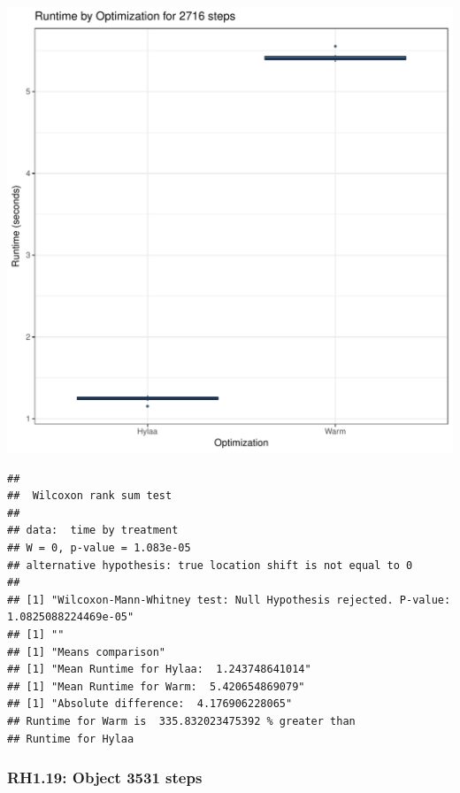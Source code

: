 \documentclass{article}\usepackage[]{graphicx}\usepackage[]{color}
\makeatletter
\def\maxwidth{ %
  \ifdim\Gin@nat@width>\linewidth
    \linewidth
  \else
    \Gin@nat@width
  \fi
}
\newenvironment{kframe}{%
 \def\at@end@of@kframe{}%
 \ifinner\ifhmode%
  \def\at@end@of@kframe{\end{minipage}}%
  \begin{minipage}{\columnwidth}%
 \fi\fi%
 \def\FrameCommand##1{\hskip\@totalleftmargin \hskip-\fboxsep
 \colorbox{shadecolor}{##1}\hskip-\fboxsep
     \hskip-\linewidth \hskip-\@totalleftmargin \hskip\columnwidth}%
 \MakeFramed {\advance\hsize-\width
   \@totalleftmargin\z@ \linewidth\hsize
   \@setminipage}}%
 {\par\unskip\endMakeFramed%
 \at@end@of@kframe}
\newenvironment{knitrout}{}{} %
\makeatother
\begin{document}
\begin{knitrout}
\color{fgcolor}
\includegraphics[width=\maxwidth]{figure/RH1_steps2716-1} 
\begin{kframe}\begin{verbatim}
## 
## 	Wilcoxon rank sum test
## 
## data:  time by treatment
## W = 0, p-value = 1.083e-05
## alternative hypothesis: true location shift is not equal to 0
## 
## [1] "Wilcoxon-Mann-Whitney test: Null Hypothesis rejected. P-value: 1.0825088224469e-05"
## [1] ""
## [1] "Means comparison"
## [1] "Mean Runtime for Hylaa:  1.243748641014"
## [1] "Mean Runtime for Warm:  5.420654869079"
## [1] "Absolute difference:  4.176906228065"
## Runtime for Warm is  335.832023475392 % greater than 
## Runtime for Hylaa
\end{verbatim}
\end{kframe}
\end{knitrout}


\subsubsection{RH1.19: Object 3531 steps}
\end{document}
